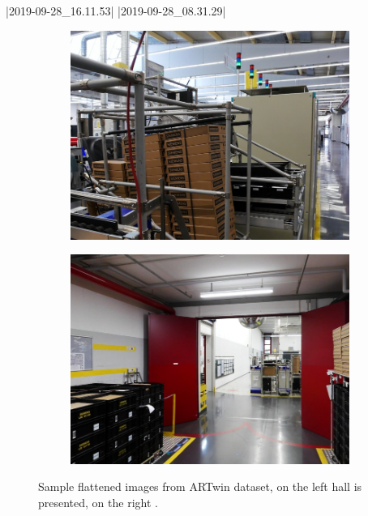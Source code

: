 |2019-09-28_16.11.53|
|2019-09-28_08.31.29|
\begin{figure}
	\centering
	\begin{subfigure}{.5\textwidth}
		\centering
		\includegraphics[width=.9\textwidth]{../graphics/2019-09-28_16.11.53_00000_x0_z90_reference.png}
	\end{subfigure}%
	\begin{subfigure}{.5\textwidth}
		\centering
		\includegraphics[width=.9\textwidth]{../graphics/2019-09-28_08.31.29_00000_x0_z60_reference.png}
	\end{subfigure}
	\caption{Sample flattened images from ARTwin dataset, on the left hall
        \protect{} is presented, on the right
        \protect{}.}\label{fig:artwin_dataset}
\end{figure}

